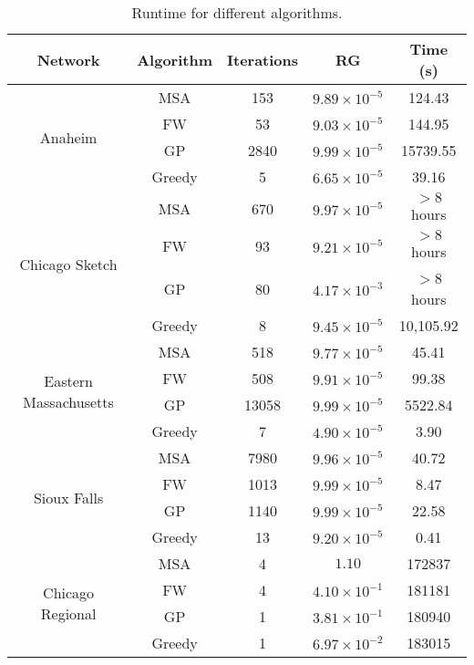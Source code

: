 \begin{table}
\caption{Runtime for different algorithms.}
\label{table:resulttable}
\center
\begin{tabular}{|c|c|c|c|c|}
\hline
Network	&	Algorithm	&	Iterations	&	RG	& Time (s)\\
\hline
\multirow{4}{*}{Anaheim}
	&	MSA	&	153	&	$9.89\times 10^{-5}$	&	124.43\\
	&	FW	&	53	&	$9.03\times 10^{-5}$	&	144.95\\
	&	GP	&	2840	&	$9.99\times 10^{-5}$	&	15739.55\\
	&	Greedy	&	5	&	$6.65\times 10^{-5}$	&	39.16\\
	\hline
\multirow{4}{*}{Chicago Sketch}
	&	MSA		&	670	&	$9.97\times 10^{-5}$	&	$>8$ hours\\
	&	FW		&	93	&	$9.21\times 10^{-5}$	&	$>8$ hours\\
	&	GP		&	80	&	$4.17\times 10^{-3}$	&	$>$8 hours\\
	&	Greedy  &	8	&	$9.45\times 10^{-5}$	&	10,105.92\\
	\hline
\multirow{4}{*}{Eastern Massachusetts}
	&	MSA		&	518	&	$9.77\times 10^{-5}$	&	45.41\\
	&	FW		&	508	&	$9.91\times 10^{-5}$	&	99.38\\
	&	GP		&	13058	&	$9.99\times 10^{-5}$	&	5522.84\\
	&	Greedy	&	7		&	$4.90\times 10^{-5}$	&	3.90\\
	\hline
\multirow{4}{*}{Sioux Falls}
	&	MSA		&	7980	&	$9.96\times 10^{-5}$	&	40.72\\
	&	FW		&	1013	&	$9.99\times 10^{-5}$	&	8.47\\
	&	GP		&	1140	&	$9.99\times 10^{-5}$	&	22.58\\
	&	Greedy	&	13		&	$9.20\times 10^{-5}$	&	0.41\\
\hline
\multirow{4}{*}{Chicago Regional}
	& MSA	&	4	&	$1.10$	&	172837\\
	& FW	&	4	&	$4.10\times 10^{-1}$	&	181181\\
	& GP	&	1	&	$3.81\times 10^{-1}$	&	180940\\
	& Greedy	&	1	&	$6.97\times 10^{-2}$	&	183015\\
\hline
\end{tabular}
\end{table}
